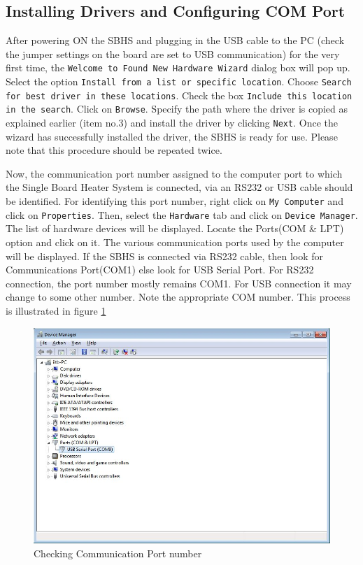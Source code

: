 \subsection{Installing Drivers and Configuring COM Port}\label{driver}
After powering ON the SBHS and plugging in the USB cable to the PC (check the jumper settings on the board are set to USB communication) for the very first time, the {\tt Welcome to Found New Hardware Wizard} dialog box will pop up. Select the option {\tt Install from a list or specific location}. Choose {\tt Search for best driver in these locations}. Check the box {\tt Include this location in the search}. Click on {\tt Browse}. Specify the path where the driver is copied as explained earlier (item no.3) and install the driver by clicking {\tt Next}. Once the wizard has successfully installed the driver, the SBHS is ready for use. Please note that this procedure should be repeated twice.

Now, the communication port number assigned to the computer port to which the Single Board Heater System is connected, via an RS232 or USB cable should be identified. For identifying this port number, right click on {\tt My Computer} and click on { \tt Properties}. Then, select the { \tt Hardware} tab and click on { \tt Device Manager}. The list of hardware devices will be displayed. Locate the Ports(COM \& LPT) option and click on it. The various communication ports used by the computer will be displayed. If the SBHS is connected via RS232 cable, then look for Communications Port(COM1) else look for USB Serial Port. For RS232 connection, the port number mostly remains COM1. For USB connection it may change to some other number. Note the appropriate COM number. This process is illustrated in figure \ref{com_number}
\begin{figure}
\centering
\includegraphics[width=0.7\linewidth]{using-sbhs/COM.jpg}
\caption{Checking Communication Port number}
\label{com_number}
\end{figure}

